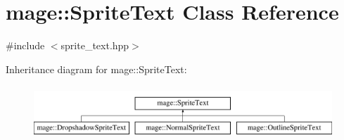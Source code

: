 \hypertarget{classmage_1_1_sprite_text}{}\section{mage\+:\+:Sprite\+Text Class Reference}
\label{classmage_1_1_sprite_text}


{\ttfamily \#include $<$sprite\+\_\+text.\+hpp$>$}

Inheritance diagram for mage\+:\+:Sprite\+Text\+:\begin{figure}[H]
\begin{center}
\leavevmode
\includegraphics[height=2.000000cm]{classmage_1_1_sprite_text}
\end{center}
\end{figure}
